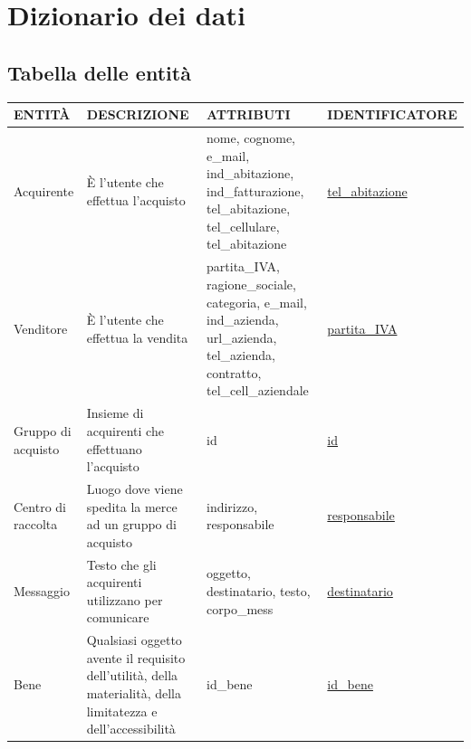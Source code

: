 \documentclass[a4paper, 10pt]{report}
\begin{document}
\chapter{Dizionario dei dati}
\section{Tabella delle entit\`a}
\begin{table}[h!]
\centering
\begin{tabular}{|l|p{3cm}|p{5cm}|p{3.5cm}|}
\hline
\textbf{ENTIT\`A}&\textbf{DESCRIZIONE}&\textbf{ATTRIBUTI}&\textbf{IDENTIFICATORE}\\
\hline
Acquirente &\`E l'utente che effettua l'acquisto & nome, cognome, e\_mail, ind\_abitazione, ind\_fatturazione, tel\_abitazione, tel\_cellulare, tel\_abitazione & \underline{tel\_abitazione}\\
\hline
Venditore & \`E l'utente che effettua la vendita & partita\_IVA, ragione\_sociale, categoria, e\_mail, ind\_azienda, url\_azienda, tel\_azienda, contratto, tel\_cell\_aziendale& \underline{partita\_IVA}\\
\hline
Gruppo di acquisto & Insieme di acquirenti che effettuano l'acquisto & id & \underline{id}\\
\hline
Centro di raccolta & Luogo dove viene spedita la merce ad un gruppo di acquisto & indirizzo, responsabile & \underline{responsabile}\\
\hline
Messaggio & Testo che gli acquirenti utilizzano per comunicare & oggetto, destinatario, testo, corpo\_mess & \underline{destinatario}\\
\hline
Bene & Qualsiasi oggetto avente il requisito dell'utilit\`a, della materialit\`a, della limitatezza e dell'accessibilit\`a & id\_bene & \underline{id\_bene} \\
\hline
\end{tabular}
\end{table}
\end{document}
